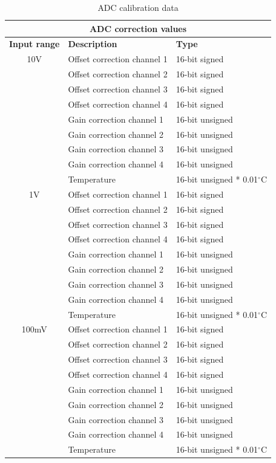 \documentclass[11pt,a4paper]{article}
\begin{document}
\begin{table}[ht]
  \centering
  \begin{tabularx}{\textwidth}{|c|l|X|}
    \hline
    \multicolumn{3}{|c|}{\textbf{ADC correction values}} \\ \hline
    \textbf{Input range}  & \textbf{Description} & \textbf{Type} \\ \hline
    10V & Offset correction channel 1 & 16-bit signed \\
    & Offset correction channel 2 & 16-bit signed \\
    & Offset correction channel 3 & 16-bit signed \\
    & Offset correction channel 4 & 16-bit signed \\
    \cline{2-3}
    & Gain correction channel 1 & 16-bit unsigned \\
    & Gain correction channel 2 & 16-bit unsigned \\
    & Gain correction channel 3 & 16-bit unsigned \\
    & Gain correction channel 4 & 16-bit unsigned \\
    \cline{2-3}
    & Temperature & 16-bit unsigned * 0.01$^\circ$C \\
    \hline
    1V & Offset correction channel 1 & 16-bit signed \\
    & Offset correction channel 2 & 16-bit signed \\
    & Offset correction channel 3 & 16-bit signed \\
    & Offset correction channel 4 & 16-bit signed \\
    \cline{2-3}
    & Gain correction channel 1 & 16-bit unsigned \\
    & Gain correction channel 2 & 16-bit unsigned \\
    & Gain correction channel 3 & 16-bit unsigned \\
    & Gain correction channel 4 & 16-bit unsigned \\
    \cline{2-3}
    & Temperature & 16-bit unsigned * 0.01$^\circ$C \\
    \hline
    100mV & Offset correction channel 1 & 16-bit signed \\
    & Offset correction channel 2 & 16-bit signed \\
    & Offset correction channel 3 & 16-bit signed \\
    & Offset correction channel 4 & 16-bit signed \\
    \cline{2-3}
    & Gain correction channel 1 & 16-bit unsigned \\
    & Gain correction channel 2 & 16-bit unsigned \\
    & Gain correction channel 3 & 16-bit unsigned \\
    & Gain correction channel 4 & 16-bit unsigned \\
    \cline{2-3}
    & Temperature & 16-bit unsigned * 0.01$^\circ$C \\
    \hline
  \end{tabularx}
  \caption{ADC calibration data}
  \label{tab:adc_calibr_data_eeprom}
\end{table}
\end{document}
